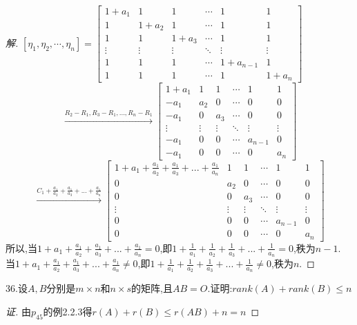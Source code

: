 \documentclass[10pt,a4paper]{report}
\begin{document}
\begin{proof}[解]
	$[\eta_{1}, \eta_{2}, \cdots, \eta_{n}] = \left[
	\begin{matrix}
	1+a_{1} & 1 & 1 & \cdots & 1 & 1 \\
	1 & 1+a_{2} & 1 & \cdots & 1 & 1 \\
	1 & 1 & 1+a_{3} & \cdots & 1 & 1 \\
	\vdots & \vdots & \vdots & \ddots & \vdots & \vdots \\
	1 & 1 & 1 & \cdots & 1+a_{n-1} & 1\\
	1 & 1 & 1 & \cdots & 1 & 1+a_{n}
	\end{matrix}
	\right]$
	$$
	\xrightarrow{R_{2}-R_{1}, R_{3}-R_{1}, ...,R_{n}-R_{1}}
	\left[
	\begin{matrix}
	1+a_{1} & 1 & 1 & \cdots & 1 & 1 \\
	-a_{1} & a_{2} & 0 & \cdots & 0 & 0 \\
	-a_{1} & 0 & a_{3} & \cdots & 0 & 0 \\
	\vdots & \vdots & \vdots & \ddots & \vdots & \vdots \\
	-a_{1} & 0 & 0 & \cdots & a_{n-1} & 0\\
	-a_{1} & 0 & 0 & \cdots & 0 & a_{n}
	\end{matrix}
	\right]
	$$
	$$
	\xrightarrow{C_{1}+\frac{a_{1}}{a_{2}}+\frac{a_{1}}{a_{3}}+...+\frac{a_{1}}{a_{n}}}
	\left[
	\begin{matrix}
	1+a_{1}+ \frac{a_{1}}{a_{2}}+\frac{a_{1}}{a_{3}}+...+\frac{a_{1}}{a_{n}}& 1 & 1 & \cdots & 1 & 1 \\
	0 & a_{2} & 0 & \cdots & 0 & 0 \\
	0 & 0 & a_{3} & \cdots & 0 & 0 \\
	\vdots & \vdots & \vdots & \ddots & \vdots & \vdots \\
	0 & 0 & 0 & \cdots & a_{n-1} & 0\\
	0 & 0 & 0 & \cdots & 0 & a_{n}
	\end{matrix}
	\right]
	$$
	所以,当$1+a_{1}+ \frac{a_{1}}{a_{2}}+\frac{a_{1}}{a_{3}}+...+\frac{a_{1}}{a_{n}} = 0$,即$1+\frac{1}{a_{1}}+ \frac{1}{a_{2}}+\frac{1}{a_{3}}+...+\frac{1}{a_{n}}=0$,秩为$n-1$.\\
	当$1+a_{1}+ \frac{a_{1}}{a_{2}}+\frac{a_{1}}{a_{3}}+...+\frac{a_{1}}{a_{n}} \neq 0$,即$1+\frac{1}{a_{1}}+ \frac{1}{a_{2}}+\frac{1}{a_{3}}+...+\frac{1}{a_{n}} \neq 0$,秩为$n$.
\end{proof}
\noindent 36.设$A,B$分别是$m \times n$和$n \times s$的矩阵,且$AB=O$.证明:$rank(A)+rank(B) \leq n$
\begin{proof}[证]
	由$p_{45}$的例2.2.3得$r(A)+r(B) \leq r(AB)+n = n$
\end{proof}
\end{document}
